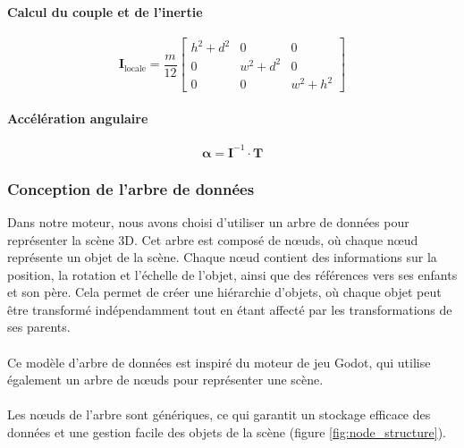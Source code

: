 \begin{multicols}{2}
        \paragraph{Calcul du couple et de l'inertie}
    
        \begin{equation}
        \mathbf{I}_{\text{locale}} = \frac{m}{12} \begin{bmatrix} h^2 + d^2 & 0 & 0 \\ 0 & w^2 + d^2 & 0 \\ 0 & 0 & w^2 + h^2 \end{bmatrix}
        \end{equation}
    
        \paragraph{Accélération angulaire}
        
        \begin{equation}
        \mathbf{\alpha} = \mathbf{I}^{-1} \cdot \mathbf{T}
        \end{equation}
    
    \end{multicols}

\subsubsection{Conception de l'arbre de données}

    Dans notre moteur, nous avons choisi d'utiliser un arbre de données
    pour représenter la scène 3D. Cet arbre est composé de n\oe{}uds, où
    chaque n\oe{}ud représente un objet de la scène. Chaque n\oe{}ud
    contient des informations sur la position, la rotation et l'échelle de
    l'objet, ainsi que des références vers ses enfants et son père.
    Cela permet de créer une hiérarchie d'objets, où chaque objet peut
    être transformé indépendamment tout en étant affecté par les
    transformations de ses parents.
    \\ \\
    Ce modèle d'arbre de données est inspiré du moteur de jeu Godot, qui
    utilise également un arbre de n\oe{}uds pour représenter une scène.
    \\ \\
    Les n\oe{}uds de l'arbre sont génériques, ce qui garantit un stockage
    efficace des données et une gestion facile des objets de la scène (figure \ref{fig:node_structure}).

